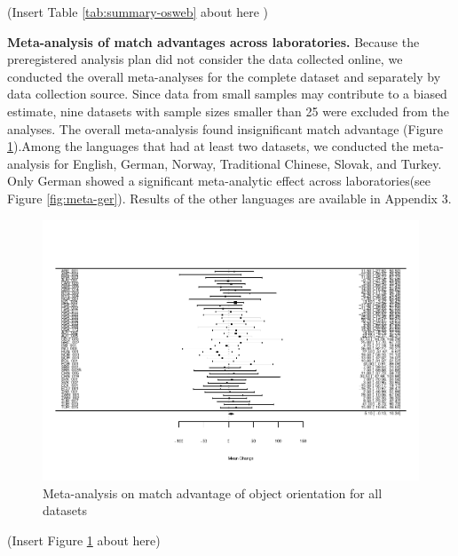 \documentclass[
  man,floatsintext]{apa6}
\begin{document}
(Insert Table \ref{tab:summary-osweb} about here )

\textbf{Meta-analysis of match advantages across laboratories.} Because the preregistered analysis plan did not consider the data collected online, we conducted the overall meta-analyses for the complete dataset and separately by data collection source. Since data from small samples may contribute to a biased estimate, nine datasets with sample sizes smaller than 25 were excluded from the analyses. The overall meta-analysis found insignificant match advantage (Figure \ref{fig:meta-all}).Among the languages that had at least two datasets, we conducted the meta-analysis for English, German, Norway, Traditional Chinese, Slovak, and Turkey. Only German showed a significant meta-analytic effect across laboratories(see Figure \ref{fig:meta-ger}). Results of the other languages are available in Appendix 3.

\begin{figure}
\centering
\includegraphics{Stage2_Report_0504_files/figure-latex/meta-all-1.pdf}
\caption{\label{fig:meta-all}Meta-analysis on match advantage of object orientation for all datasets}
\end{figure}

(Insert Figure \ref{fig:meta-all} about here)
\end{document}
